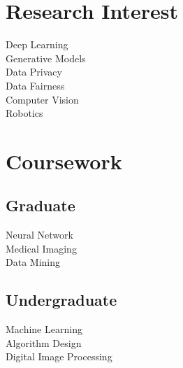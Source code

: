 \documentclass[]{deedy-resume-openfont}
\begin{document}
\begin{minipage}[t]{0.33\textwidth}
\section{Research Interest}
Deep Learning \\
Generative Models \\
Data Privacy \\
Data Fairness \\
Computer Vision \\
Robotics
\sectionsep


\section{Coursework}
\subsection{Graduate}
Neural Network \\
Medical Imaging \\
Data Mining \\
\sectionsep

\subsection{Undergraduate}
Machine Learning \\
Algorithm Design \\
Digital Image Processing \\
\sectionsep



\end{minipage}
\end{document}

